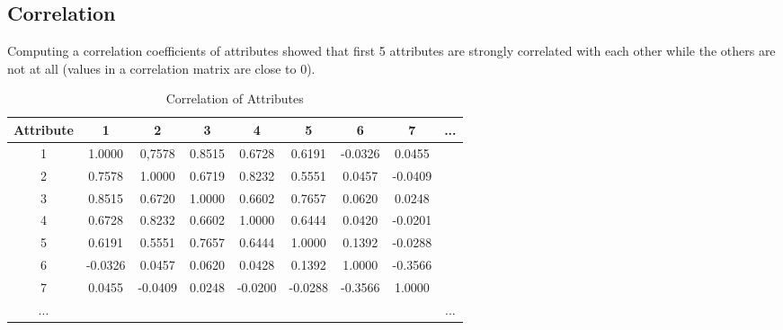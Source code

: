 \subsection*{Correlation}
Computing a correlation coefficients of attributes showed that first 5 attributes
are strongly correlated with each other while the others are not at all (values in
a correlation matrix are close to 0).
\begin{table}[ht!]
    \centering
    \begin{tabular}{|c|c|c|c|c|c|c|c|c}
         \hline
             Attribute & 1 & 2 & 3 & 4 & 5 & 6 & 7 & ... \\ \hline
             1 & 1.0000  & 0,7578  & 0.8515 &  0.6728  & 0.6191  & -0.0326 & 0.0455  \\ \hline
             2 & 0.7578  & 1.0000  & 0.6719 &  0.8232  & 0.5551  & 0.0457  & -0.0409 \\ \hline
             3 & 0.8515  & 0.6720  & 1.0000 &  0.6602  & 0.7657  & 0.0620  & 0.0248  \\ \hline
             4 & 0.6728  & 0.8232  & 0.6602 &  1.0000  & 0.6444  & 0.0420  & -0.0201 \\ \hline
             5 & 0.6191  & 0.5551  & 0.7657 &  0.6444  & 1.0000  & 0.1392  & -0.0288 \\ \hline
             6 & -0.0326 & 0.0457  & 0.0620 &  0.0428  & 0.1392  & 1.0000  & -0.3566 \\ \hline
             7 & 0.0455  & -0.0409 & 0.0248 &  -0.0200 & -0.0288 & -0.3566 & 1.0000  \\ \hline
             ... &  &  &  &  &  &  &  & ... \\ 
    \end{tabular}
    \caption{Correlation of Attributes}
\end{table}



